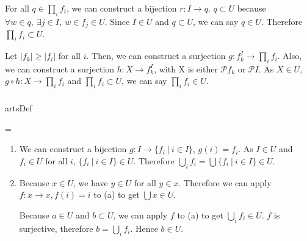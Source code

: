 \documentclass{article}
\newcounter{artCounter}
\newcounter{maxArts}
\newcommand{\showArt}{
\csname artsDef\roman{artCounter}\endcsname
\addtocounter{artCounter}{1}
\ifnum \value{artCounter}=\value{maxArts}
\setcounter{artCounter}{0}
\fi
}
\begin{document}
For all $q \in \prod_i f_i$, we can construct a bijection $r : I \rightarrow q$. $q \subset U$ because $\forall w \in q,\ \exists j \in I,\ w \in f_j \in U$. Since $I \in U$ and $q \subset U$, we can say $q \in U$. Therefore $\prod_i f_i \subset U$.

Let $|f_k| \geq |f_i|$ for all $i$. Then, we can construct a surjection $g : f_k^I \rightarrow \prod_i f_i$. Also, we can construct a surjection $h : X \rightarrow f_k^I$, with X is either $\mathcal{P} f_k$ or $\mathcal{P} I$. As $X \in U$, $g \circ h : X \rightarrow \prod_i f_i$ and $\prod_i f_i \subset U$, we can say $\prod_i f_i \in U$.

\subsubsection{}



\showArt

\begin{enumerate}[label=(\alph*)]
\item We can construct a bijection $g :  I \rightarrow \{f_i\ |\ i \in I\}$, $g(i) = f_i$. As $I \in U$ and $f_i \in U$ for all $i$, $\{f_i\ |\ i \in I\} \in U$. Therefore $ \bigcup_i f_i = \bigcup \{f_i\ |\ i \in I\} \in U$.
\item Because $x \in U$, we have $y \in U$ for all $y \in x$. Therefore we can apply $f : x \rightarrow x, f(i) = i$ to (a) to get $\bigcup x \in U$.

Because $a \in U$ and $b \subset U$, we can apply $f$ to (a) to get $\bigcup_i f_i \in U$. $f$ is surjective, therefore $b = \bigcup_i f_i$. Hence $b \in U$.
\end{enumerate}

\subsection{}

\subsection{}

\section{}

\subsection{}
\end{document}
